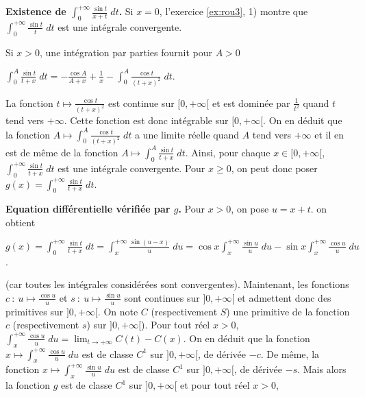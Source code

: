 {{\begin{center}
\end{center}

\textbf{Existence de $\int_{0}^{+\infty}\frac{\sin t}{x+t}\;dt$.} Si $x=0$, l'exercice \ref{ex:rou3}, 1)  montre que $\int_{0}^{+\infty}\frac{\sin t}{t}\;dt$ est une intégrale convergente.

Si $x>0$, une intégration par parties fournit pour $A>0$

\begin{center}
$\int_{0}^{A}\frac{\sin t}{t+x}\;dt=-\frac{\cos A}{A+x}+\frac{1}{x}-\int_{0}^{A}\frac{\cos t}{(t+x)^2}\;dt$.
\end{center}

La fonction $t\mapsto\frac{\cos t}{(t+x)^2}$ est continue sur $[0,+\infty[$ et est dominée par $\frac{1}{t^2}$ quand $t$ tend vers $+\infty$. Cette fonction est donc intégrable sur $[0,+\infty[$. On en déduit que la fonction $A\mapsto\int_{0}^{A}\frac{\cos t}{(t+x)^2}\;dt$ a une limite réelle quand $A$ tend vers $+\infty$ et il en est de même de la fonction $A\mapsto\int_{0}^{A}\frac{\sin t}{t+x}\;dt$. Ainsi, pour chaque $x\in[0,+\infty[$, $\int_{0}^{+\infty}\frac{\sin t}{t+x}\;dt$ est une intégrale convergente. Pour $x\geqslant 0$, on peut donc poser $g(x)=\int_{0}^{+\infty}\frac{\sin t}{t+x}\;dt$.

\textbf{Equation différentielle vérifiée par $g$.} Pour $x>0$, on pose $u=x+t$. on obtient

\begin{center}
$g(x)=\int_{0}^{+\infty}\frac{\sin t}{t+x}\;dt=\int_{x}^{+\infty}\frac{\sin(u-x)}{u}\;du=\cos x\int_{x}^{+\infty}\frac{\sin u}{u}\;du-\sin x\int_{x}^{+\infty}\frac{\cos u}{u}\;du$.
\end{center}

(car toutes les intégrales considérées sont convergentes). Maintenant, les fonctions $c~:~u\mapsto\frac{\cos u}{u}$ et $s~:~u\mapsto\frac{\sin u}{u}$ sont continues sur $]0,+\infty[$ et admettent donc des primitives sur $]0,+\infty[$. On note $C$ (respectivement $S$) une primitive de la fonction $c$ (respectivement $s$) sur $]0,+\infty[$). Pour tout réel $x>0$, $\int_{x}^{+\infty}\frac{\cos u}{u}\;du=\lim_{t \rightarrow +\infty}C(t)-C(x)$. On en déduit que la fonction $x\mapsto\int_{x}^{+\infty}\frac{\cos u}{u}\;du$ est de classe $C^1$ sur $]0,+\infty[$, de dérivée $-c$. De même, la fonction $x\mapsto\int_{x}^{+\infty}\frac{\sin u}{u}\;du$ est de classe $C^1$ sur $]0,+\infty[$, de dérivée $-s$. Mais alors la fonction $g$ est de classe $C^1$ sur $]0,+\infty[$ et pour tout réel $x>0$,

}}
